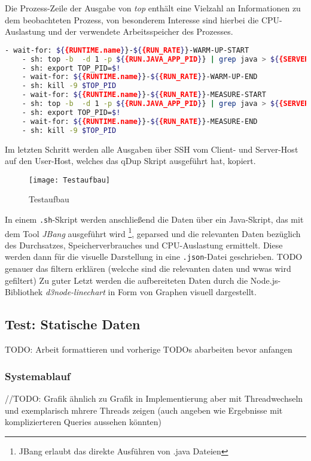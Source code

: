 Die Prozess-Zeile der Ausgabe von \textit{top} enthält eine Vielzahl an Informationen zu dem beobachteten Prozess, von besonderem
Interesse sind hierbei die CPU-Auslastung und der verwendete Arbeitsspeicher des Prozesses.

\begin{lstlisting}[language=sh, caption=Auszug des qDup Skripts capture-platform-stats, captionpos=b]
    - wait-for: ${{RUNTIME.name}}-${{RUN_RATE}}-WARM-UP-START
    - sh: top -b  -d 1 -p ${{RUN.JAVA_APP_PID}} | grep java > ${{SERVER_FILE_PATH}}/output/${{RUNTIME.name}}-${{RUN_RATE}}-WARM-UP-top.out &
    - sh: export TOP_PID=$!
    - wait-for: ${{RUNTIME.name}}-${{RUN_RATE}}-WARM-UP-END
    - sh: kill -9 $TOP_PID
    - wait-for: ${{RUNTIME.name}}-${{RUN_RATE}}-MEASURE-START
    - sh: top -b  -d 1 -p ${{RUN.JAVA_APP_PID}} | grep java > ${{SERVER_FILE_PATH}}/output/${{RUNTIME.name}}-${{RUN_RATE}}-MEASURE-top.out &
    - sh: export TOP_PID=$!
    - wait-for: ${{RUNTIME.name}}-${{RUN_RATE}}-MEASURE-END
    - sh: kill -9 $TOP_PID
  \end{lstlisting}

Im letzten Schritt werden alle Ausgaben über SSH vom Client- und Server-Host auf den User-Host, welches das qDup Skript ausgeführt hat, kopiert.

\begin{figure}[h!]
	\centering
	\texttt{[image: Testaufbau]}
	\caption{Testaufbau}
\end{figure}

In einem \verb|.sh|-Skript werden anschließend die Daten über ein Java-Skript, das mit dem Tool \textit{JBang} ausgeführt
wird \footnote{JBang erlaubt das direkte Ausführen von .java Dateien},
geparsed und die relevanten Daten bezüglich des Durchsatzes, Speicherverbrauches und CPU-Auslastung ermittelt.
Diese werden dann für die visuelle Darstellung in eine \verb|.json|-Datei geschrieben.
TODO genauer das filtern erklären (welcche sind die relevanten daten und wwas wird gefiltert)
Zu guter Letzt werden die aufbereiteten Daten durch die Node.js-Bibliothek \textit{d3node-linechart} in Form von Graphen visuell dargestellt.

\subsection{Test: Statische Daten}
\label{section:statische_daten}
TODO: Arbeit formattieren und vorherige TODOs abarbeiten bevor anfangen
\subsubsection{Systemablauf}
//TODO: Grafik ähnlich zu Grafik in Implementierung aber mit Threadwechseln und exemplarisch mhrere Threads zeigen
(auch angeben wie Ergebnisse mit komplizierteren Queries aussehen könnten)
